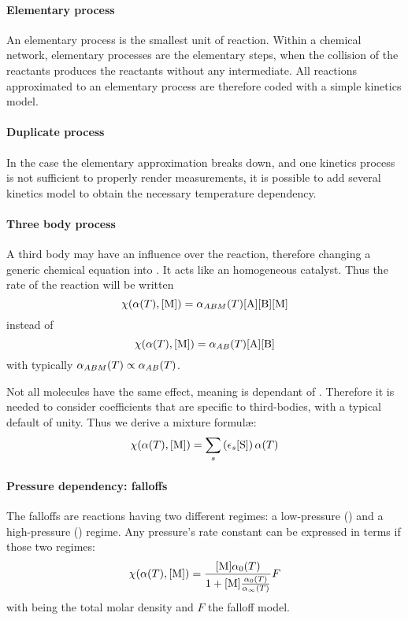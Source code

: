 \paragraph{Elementary process}

An elementary process is the smallest unit of reaction. Within a chemical
network, elementary processes are the elementary steps, when the collision
of the reactants produces the reactants without any intermediate. All
reactions approximated to an elementary process are therefore coded with
a simple kinetics model.

\paragraph{Duplicate process}

In the case the elementary approximation breaks down, and one kinetics
process is not sufficient to properly render measurements, it is possible
to add several kinetics model to obtain the necessary temperature
dependency.

\paragraph{Three body process}
\label{subsub:three_body}

A third body may have an influence over the reaction, therefore
changing a generic chemical equation  into
. It acts like an homogeneous catalyst.
Thus the rate of the reaction will be written
\[
\chemProc = \kinMod[ABM]\conc[A]\conc[B]\conc[M]
\]
instead of
\[
\chemProc = \kinMod[AB]\conc[A]\conc[B]
\]
with typically $\kinMod[ABM] \propto \kinMod[AB]$.

Not all molecules have the same effect, meaning \rcons[ABM]
is dependant of . Therefore it is needed to
consider coefficients that are specific to third-bodies,
with a typical default of unity. Thus we derive a mixture
formul\ae:
\begin{equation}
\chemProc = \threeBody\kinMod
\label{kinproc:Three_body}
\end{equation}

\paragraph{Pressure dependency: falloffs}
\label{subsub:falloff}

The falloffs are reactions having two different regimes: a low-pressure (\kinModZ) and
a high-pressure (\kinModI) regime. Any pressure's rate constant can be expressed in
terms if those two regimes:
\begin{equation}
\chemProc = \frac{\conc[M]\kinModZ}{1 + \conc[M]\frac{\kinModZ}{\kinModI}} F
\label{falloff:k}
\end{equation}
with \conc[M] being the total molar density and $F$ the falloff model.

